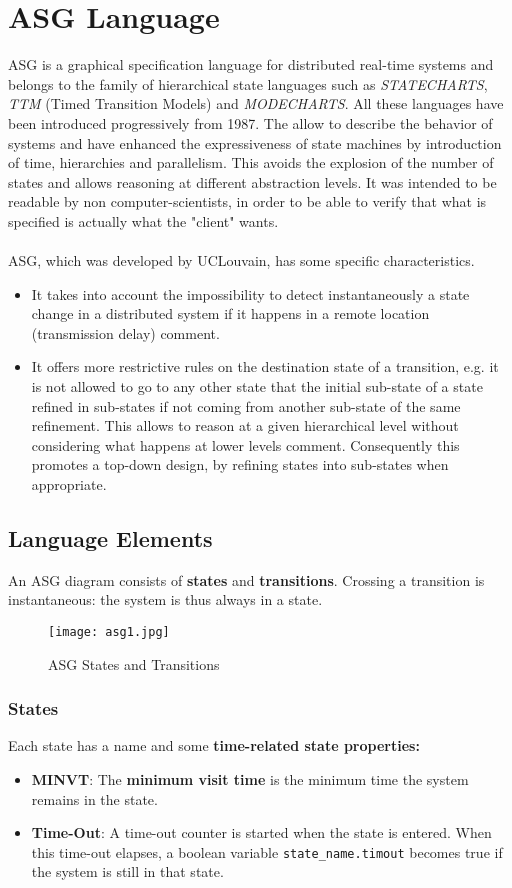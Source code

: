\documentclass[../main.tex]{subfiles}
\begin{document}
\chapter{ASG Language}
ASG is a graphical specification language for distributed real-time systems and belongs to the family of hierarchical state languages such as \textit{STATECHARTS}, \textit{TTM} (Timed Transition Models) and \textit{MODECHARTS}. All these languages have been introduced progressively from 1987. The allow to describe the behavior of systems and have enhanced the expressiveness of state machines by introduction of time, hierarchies and parallelism. This avoids the explosion of the number of states and allows reasoning at different abstraction levels. It was intended to be readable by non computer-scientists, in order to be able to verify that what is specified is actually what the "client" wants.
\\\\
ASG, which was developed by UCLouvain, has some specific characteristics. 
\begin{itemize}
	\item It takes into account the impossibility to detect instantaneously a state change in a distributed system if it happens in a remote location (transmission delay) comment.
	\item It offers more restrictive rules on the destination state of a transition, e.g. it is not allowed to go to any other state that the initial sub-state of a state refined in sub-states if not coming from another sub-state of the same refinement. This allows to reason at a given hierarchical level without considering what happens at lower levels  comment. Consequently this promotes a top-down design, by refining states into sub-states when appropriate.
\end{itemize}

\section{Language Elements}
An ASG diagram consists of \textbf{states} and \textbf{transitions}. Crossing a transition is instantaneous: the system is thus always in a state.
\begin{figure}[H]
    \centering
    \texttt{[image: asg1.jpg]}
    \caption{ASG States and Transitions}
    \label{asg1}
\end{figure}

\subsection{States}
Each state has a name and some \textbf{time-related state properties:}
\begin{itemize}
	\item \textbf{MINVT}: The \textbf{minimum visit time} is the minimum time the system remains in the state.
	\item \textbf{Time-Out}: A time-out counter is started when the state is entered. When this time-out elapses, a boolean variable \texttt{state\_name.timout} becomes true if the system is still in that state. 
\end{itemize}
\end{document}
